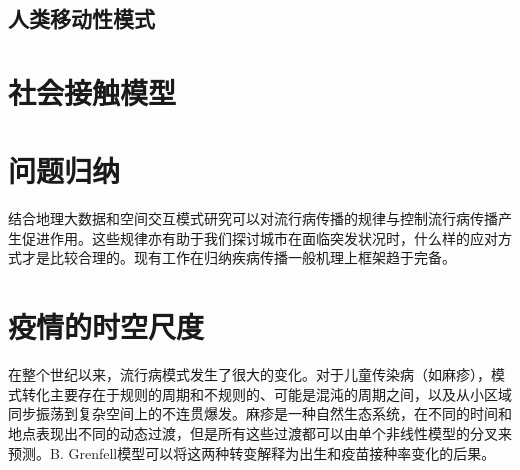 \subsection{人类移动性模式}



\section{社会接触模型}

\section{问题归纳}

结合地理大数据和空间交互模式研究可以对流行病传播的规律与控制流行病传播产生促进作用。这些规律亦有助于我们探讨城市在面临突发状况时，什么样的应对方式才是比较合理的。现有工作在归纳疾病传播一般机理上框架趋于完备。

\section{疫情的时空尺度}

在整个世纪以来，流行病模式发生了很大的变化。对于儿童传染病（如麻疹），模式转化主要存在于规则的周期和不规则的、可能是混沌的周期之间，以及从小区域同步振荡到复杂空间上的不连贯爆发。麻疹是一种自然生态系统，在不同的时间和地点表现出不同的动态过渡，但是所有这些过渡都可以由单个非线性模型的分叉来预测。B. Grenfell模型\cite{earn2000a}可以将这两种转变解释为出生和疫苗接种率变化的后果。
